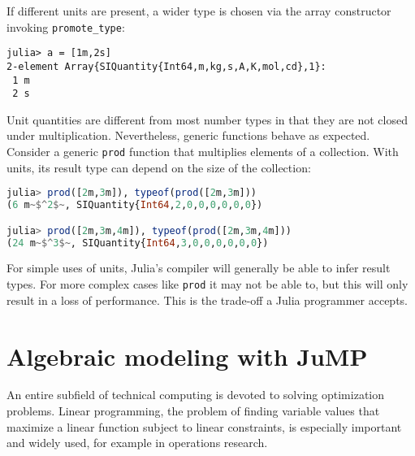 \noindent
If different units are present, a wider type is chosen via the array
constructor invoking \texttt{promote\_type}:

\vspace{-2ex}
\begin{singlespace}
\begin{verbatim}
julia> a = [1m,2s]
2-element Array{SIQuantity{Int64,m,kg,s,A,K,mol,cd},1}:
 1 m
 2 s
\end{verbatim}
\end{singlespace}

Unit quantities are different from most number types in that they are not
closed under multiplication.
Nevertheless, generic functions behave as expected.
Consider a generic \texttt{prod} function that multiplies elements of a
collection.
With units, its result type can depend on the size of the collection:

\begin{singlespace}
\begin{lstlisting}[language=julia]
julia> prod([2m,3m]), typeof(prod([2m,3m]))
(6 m~$^2$~, SIQuantity{Int64,2,0,0,0,0,0,0})

julia> prod([2m,3m,4m]), typeof(prod([2m,3m,4m]))
(24 m~$^3$~, SIQuantity{Int64,3,0,0,0,0,0,0})
\end{lstlisting}
\end{singlespace}

\noindent
For simple uses of units, Julia's compiler will generally be able to
infer result types.
For more complex cases like \texttt{prod} it may not be able to, but
this will only result in a loss of performance.
This is the trade-off a Julia programmer accepts.





\section{Algebraic modeling with JuMP}
\label{sec:jump}

An entire subfield of technical computing is devoted to solving optimization
problems.
Linear programming, the problem of finding variable values that maximize a
linear function subject to linear constraints, is especially important and
widely used, for example in operations research.

